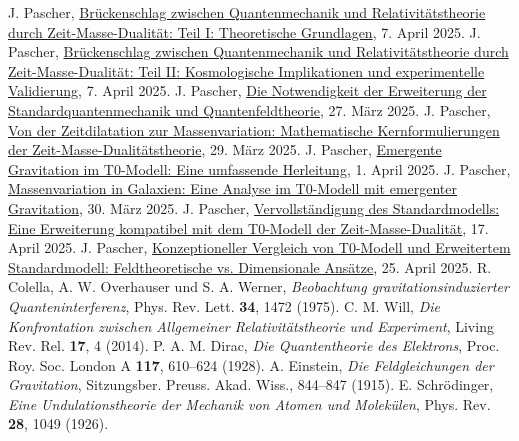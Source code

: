 \documentclass[12pt,a4paper]{article}
\begin{document}
	
	\begin{thebibliography}{99}
		 J. Pascher, \href{https://github.com/jpascher/T0-Time-Mass-Duality/tree/main/2/pdf/English/QMRelTimeMassPart1En.pdf}{Brückenschlag zwischen Quantenmechanik und Relativitätstheorie durch Zeit-Masse-Dualität: Teil I: Theoretische Grundlagen}, 7. April 2025.
		 J. Pascher, \href{https://github.com/jpascher/T0-Time-Mass-Duality/tree/main/2/pdf/English/QMRelTimeMassPart2En.pdf}{Brückenschlag zwischen Quantenmechanik und Relativitätstheorie durch Zeit-Masse-Dualität: Teil II: Kosmologische Implikationen und experimentelle Validierung}, 7. April 2025.
		 J. Pascher, \href{https://github.com/jpascher/T0-Time-Mass-Duality/tree/main/2/pdf/English/NotwendigkeitQMErweiterungEn.pdf}{Die Notwendigkeit der Erweiterung der Standardquantenmechanik und Quantenfeldtheorie}, 27. März 2025.
		 J. Pascher, \href{https://github.com/jpascher/T0-Time-Mass-Duality/tree/main/2/pdf/English/MathZeitMasseLagrangeEn.pdf}{Von der Zeitdilatation zur Massenvariation: Mathematische Kernformulierungen der Zeit-Masse-Dualitätstheorie}, 29. März 2025.
		 J. Pascher, \href{https://github.com/jpascher/T0-Time-Mass-Duality/tree/main/2/pdf/English/EmergentGravT0En.pdf}{Emergente Gravitation im T0-Modell: Eine umfassende Herleitung}, 1. April 2025.
		 J. Pascher, \href{https://github.com/jpascher/T0-Time-Mass-Duality/tree/main/2/pdf/English/MassVarGalaxienEn.pdf}{Massenvariation in Galaxien: Eine Analyse im T0-Modell mit emergenter Gravitation}, 30. März 2025.
		 J. Pascher, \href{https://github.com/jpascher/T0-Time-Mass-Duality/tree/main/2/pdf/English/StandardModKruemmungRotvEn.pdf}{Vervollständigung des Standardmodells: Eine Erweiterung kompatibel mit dem T0-Modell der Zeit-Masse-Dualität}, 17. April 2025.
		 J. Pascher, \href{https://github.com/jpascher/T0-Time-Mass-Duality/tree/main/2/pdf/English/T0vsESM_ConceptualAnalysisEn.pdf}{Konzeptioneller Vergleich von T0-Modell und Erweitertem Standardmodell: Feldtheoretische vs. Dimensionale Ansätze}, 25. April 2025.
		 R. Colella, A. W. Overhauser und S. A. Werner, \textit{Beobachtung gravitationsinduzierter Quanteninterferenz}, Phys. Rev. Lett. \textbf{34}, 1472 (1975).
		 C. M. Will, \textit{Die Konfrontation zwischen Allgemeiner Relativitätstheorie und Experiment}, Living Rev. Rel. \textbf{17}, 4 (2014).
		 P. A. M. Dirac, \textit{Die Quantentheorie des Elektrons}, Proc. Roy. Soc. London A \textbf{117}, 610--624 (1928).
		 A. Einstein, \textit{Die Feldgleichungen der Gravitation}, Sitzungsber. Preuss. Akad. Wiss., 844--847 (1915).
		 E. Schrödinger, \textit{Eine Undulationstheorie der Mechanik von Atomen und Molekülen}, Phys. Rev. \textbf{28}, 1049 (1926).
	\end{thebibliography}
	
\end{document}
